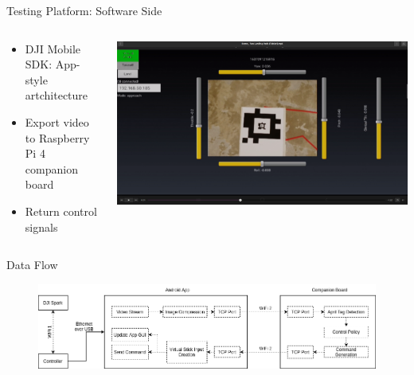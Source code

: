\documentclass[aspectratio=169]{beamer}
\begin{document}
\begin{frame}{Testing Platform: Software Side}
	\begin{columns}
	\begin{column}{0.5\textwidth}
	\begin{itemize}
		\item DJI Mobile SDK: App-style artchitecture
		\item Export video to Raspberry Pi 4 companion board
		\item Return control signals
	\end{itemize}
	\end{column}
	\begin{column}{0.5\textwidth}
		\centering
		\includegraphics[width=\textwidth]{./images/tablet_screenshot}
	\end{column}
	\end{columns}
\end{frame}

\begin{frame}{Data Flow}
	\begin{figure}
		\centering
		\includegraphics[width=\textwidth]{./images/spark_architecture.drawio}
	\end{figure}
\end{frame}
\end{document}

